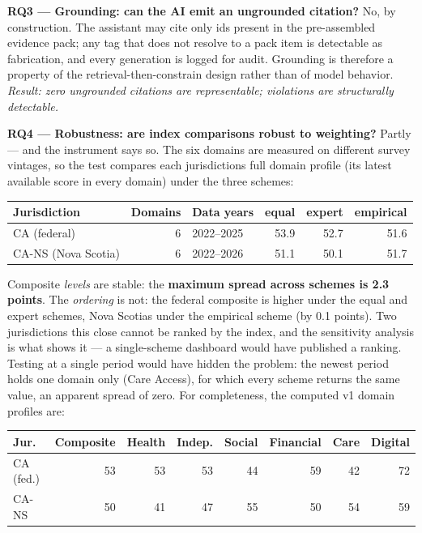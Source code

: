\documentclass[
  11pt,
]{article}
\begin{document}
\textbf{RQ3 --- Grounding: can the AI emit an ungrounded citation?} No,
by construction. The assistant may cite only ids present in the
pre-assembled evidence pack; any tag that does not resolve to a pack
item is detectable as fabrication, and every generation is logged for
audit. Grounding is therefore a property of the retrieval-then-constrain
design rather than of model behavior. \emph{Result: zero ungrounded
citations are representable; violations are structurally detectable.}

\textbf{RQ4 --- Robustness: are index comparisons robust to weighting?}
Partly --- and the instrument says so. The six domains are measured on
different survey vintages, so the test compares each
jurisdiction\textquotesingle s full domain profile (its latest available
score in every domain) under the three schemes:

\begin{longtable}[]{@{}lrlrrr@{}}
\toprule\noalign{}
Jurisdiction & Domains & Data years & equal & expert & empirical \\
\midrule\noalign{}
\endhead
\bottomrule\noalign{}
\endlastfoot
CA (federal) & 6 & 2022--2025 & 53.9 & 52.7 & 51.6 \\
CA-NS (Nova Scotia) & 6 & 2022--2026 & 51.1 & 50.1 & 51.7 \\
\end{longtable}

Composite \emph{levels} are stable: the \textbf{maximum spread across
schemes is 2.3 points}. The \emph{ordering} is not: the federal
composite is higher under the equal and expert schemes, Nova
Scotia\textquotesingle s under the empirical scheme (by 0.1 points). Two
jurisdictions this close cannot be ranked by the index, and the
sensitivity analysis is what shows it --- a single-scheme dashboard
would have published a ranking. Testing at a single period would have
hidden the problem: the newest period holds one domain only (Care
Access), for which every scheme returns the same value, an apparent
spread of zero. For completeness, the computed v1 domain profiles are:

\begin{longtable}[]{@{}lrrrrrrr@{}}
\toprule\noalign{}
Jur. & Composite & Health & Indep. & Social & Financial & Care &
Digital \\
\midrule\noalign{}
\endhead
\bottomrule\noalign{}
\endlastfoot
CA (fed.) & 53 & 53 & 53 & 44 & 59 & 42 & 72 \\
CA-NS & 50 & 41 & 47 & 55 & 50 & 54 & 59 \\
\end{longtable}
\end{document}
